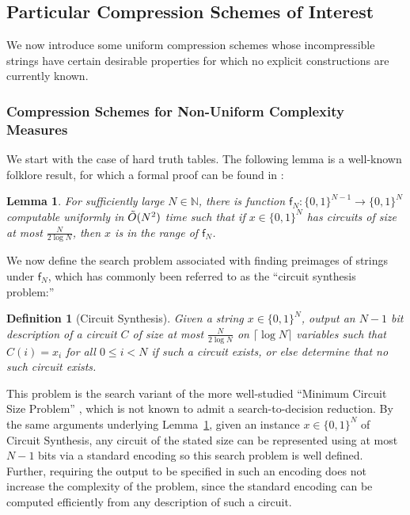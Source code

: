 \documentclass[11pt]{article}
\newtheorem{lemma}{Lemma}
\newtheorem{definition}{Definition}
\newcommand{\B}{\{0,1\}}
\begin{document}
\subsection{Particular Compression Schemes of Interest}\label{subsec:particular-pairs}
We now introduce some uniform compression schemes whose incompressible strings have certain desirable properties for which no explicit constructions are currently known.
\subsubsection{Compression Schemes for Non-Uniform Complexity Measures}\label{subsubsec:tt-gens}
We start with the case of hard truth tables. The following lemma is a well-known folklore result, for which a formal proof can be found in \cite{Korten}:
\begin{lemma}\label{lem:tt-in-apepp}
For sufficiently large $N \in \mathbb{N}$, there is function $\mathsf{f}_N\colon \B^{N-1} \rightarrow \B^{N}$ computable uniformly in $\Tilde{O}(N^2)$ time such that if $x \in \B^N$ has circuits of size at most $\frac{N}{2 \log N}$, then $x$ is in the range of $\mathsf{f}_N$.
\end{lemma}

We now define the search problem associated with finding preimages of strings under $\mathsf{f}_N$, which has commonly been referred to as the ``circuit synthesis problem:''
\begin{definition}[{\sc Circuit Synthesis}]
Given a string $x \in \B^N$, output an $N-1$ bit description of a circuit $C$ of size at most $\frac{N}{2\log N}$ on $\lceil \log N \rceil$ variables such that  $C(i) = x_i$ for all $0 \leq i < N$ if such a circuit exists, or else determine that no such circuit exists. 
\end{definition}
This problem is the search variant of the more well-studied ``Minimum Circuit Size Problem'' \cite{circuit-minimization}, which is not known to admit a search-to-decision reduction. By the same arguments underlying Lemma~\ref{lem:tt-in-apepp}, given an instance $x \in \B^N$ of {\sc Circuit Synthesis}, any circuit of the stated size can be represented using at most $N-1$ bits via a standard encoding so this search problem is well defined. Further, requiring the output to be specified in such an encoding does not increase the complexity of the problem, since the standard encoding can be computed efficiently from any description of such a circuit. 
\end{document}
